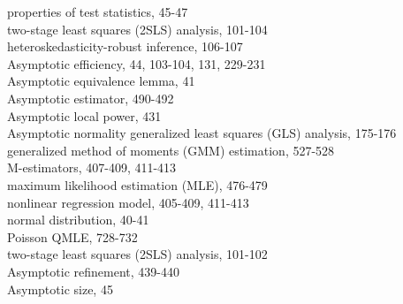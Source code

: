 \documentclass[10pt]{article}
\begin{document}
properties of test statistics, 45-47\\
two-stage least squares (2SLS) analysis, 101-104\\
heteroskedasticity-robust inference, 106-107\\
Asymptotic efficiency, 44, 103-104, 131, 229-231\\
Asymptotic equivalence lemma, 41\\
Asymptotic estimator, 490-492\\
Asymptotic local power, 431\\
Asymptotic normality generalized least squares (GLS) analysis, 175-176\\
generalized method of moments (GMM) estimation, 527-528\\
M-estimators, 407-409, 411-413\\
maximum likelihood estimation (MLE), 476-479\\
nonlinear regression model, 405-409, 411-413\\
normal distribution, 40-41\\
Poisson QMLE, 728-732\\
two-stage least squares (2SLS) analysis, 101-102\\
Asymptotic refinement, 439-440\\
Asymptotic size, 45
\end{document}
